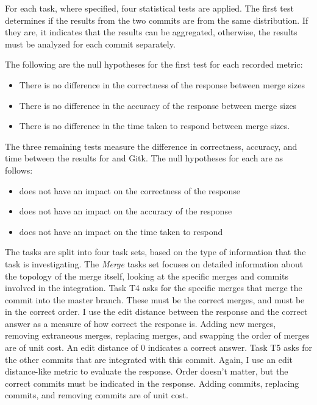 For each task, where specified, four statistical tests are applied.
The first test determines if the results from the two commits are from
the same distribution.
If they are, it indicates that the results can be aggregated, otherwise,
the results must be analyzed for each commit separately.

The following are the null hypotheses for the first test for each
recorded metric:
\begin{itemize}
  \item There is no difference in the correctness of the response
    between merge sizes
  \item There is no difference in the accuracy of the response between
    merge sizes
  \item There is no difference in the time taken to respond between
    merge sizes.
\end{itemize}

The three remaining tests measure the difference in correctness,
accuracy, and time between the results for \tool{} and Gitk.
The null hypotheses for each are as follows:
\begin{itemize}
  \item \tool{} does not have an impact on the correctness of the
    response
  \item \tool{} does not have an impact on the accuracy of the response
  \item \tool{} does not have an impact on the time taken to respond
\end{itemize}

The tasks are split into four task sets, based on the type of
information that the task is investigating. The \emph{Merge} tasks set
focuses on detailed information about the topology of the merge itself,
looking at the specific merges and commits involved in the integration.
Task T4 asks for the specific merges that merge the commit into the
master branch. These must be the correct merges, and must be in the
correct order. I use the edit distance between the response and the
correct answer as a measure of how correct the response is. Adding new
merges, removing extraneous merges, replacing merges, and swapping the
order of merges are of unit cost. An edit distance of 0 indicates a
correct answer. Task T5 asks for the other commits that are integrated
with this commit. Again, I use an edit distance-like metric to evaluate
the response. Order doesn't matter, but the correct commits must be
indicated in the response. Adding commits, replacing commits, and
removing commits are of unit cost.

